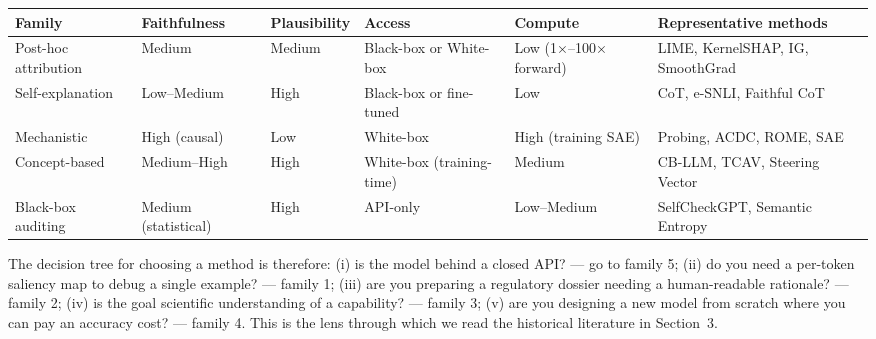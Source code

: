 {\def\LTcaptype{none} %
\begin{longtable}[]{@{}
  >{\raggedright\arraybackslash}p{}
  >{\raggedright\arraybackslash}p{}
  >{\raggedright\arraybackslash}p{}
  >{\raggedright\arraybackslash}p{}
  >{\raggedright\arraybackslash}p{}
  >{\raggedright\arraybackslash}p{}@{}}
\toprule\noalign{}
\begin{minipage}[b]{\linewidth}\raggedright
Family
\end{minipage} & \begin{minipage}[b]{\linewidth}\raggedright
Faithfulness
\end{minipage} & \begin{minipage}[b]{\linewidth}\raggedright
Plausibility
\end{minipage} & \begin{minipage}[b]{\linewidth}\raggedright
Access
\end{minipage} & \begin{minipage}[b]{\linewidth}\raggedright
Compute
\end{minipage} & \begin{minipage}[b]{\linewidth}\raggedright
Representative methods
\end{minipage} \\
\midrule\noalign{}
\endhead
\bottomrule\noalign{}
\endlastfoot
Post-hoc attribution & Medium & Medium & Black-box or White-box & Low (1×--100× forward) & LIME, KernelSHAP, IG, SmoothGrad \\
Self-explanation & Low--Medium & High & Black-box or fine-tuned & Low & CoT, e-SNLI, Faithful CoT \\
Mechanistic & High (causal) & Low & White-box & High (training SAE) & Probing, ACDC, ROME, SAE \\
Concept-based & Medium--High & High & White-box (training-time) & Medium & CB-LLM, TCAV, Steering Vector \\
Black-box auditing & Medium (statistical) & High & API-only & Low--Medium & SelfCheckGPT, Semantic Entropy \\
\end{longtable}
}

The decision tree for choosing a method is therefore: (i) is the model behind a closed API? --- go to family 5; (ii) do you need a per-token saliency map to debug a single example? --- family 1; (iii) are you preparing a regulatory dossier needing a human-readable rationale? --- family 2; (iv) is the goal scientific understanding of a capability? --- family 3; (v) are you designing a new model from scratch where you can pay an accuracy cost? --- family 4. This is the lens through which we read the historical literature in Section~3.

